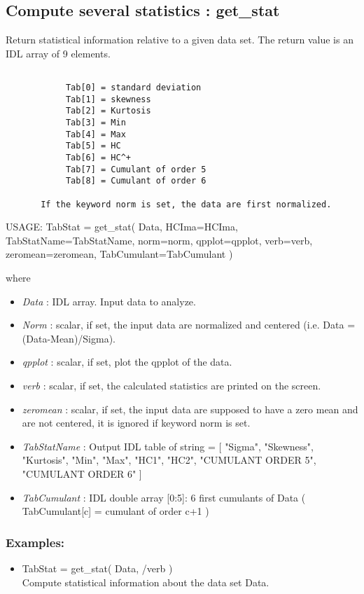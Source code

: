 \subsection{Compute several statistics : get\_stat}
Return statistical information relative to a given data set. The return value is an IDL array of 9 elements.
\begin{verbatim}

			Tab[0] = standard deviation
			Tab[1] = skewness
			Tab[2] = Kurtosis
			Tab[3] = Min
			Tab[4] = Max 
			Tab[5] = HC
			Tab[6] = HC^+
			Tab[7] = Cumulant of order 5
			Tab[8] = Cumulant of order 6

       If the keyword norm is set, the data are first normalized.
\end{verbatim}
{\bf
\begin{center}
     USAGE: TabStat = get\_stat( Data, HCIma=HCIma, TabStatName=TabStatName, norm=norm, qpplot=qpplot, verb=verb, zeromean=zeromean, TabCumulant=TabCumulant )  
\end{center}}
where 
\begin{itemize}
\item {\em Data} : IDL array. Input data to analyze. 
\item {\em Norm} : scalar, if set, the input data are normalized and centered (i.e. Data = (Data-Mean)/Sigma).  
\item {\em qpplot} : scalar, if set, plot the qpplot of the data.
\item {\em verb} : scalar, if set, the calculated statistics are printed on the screen.
\item {\em zeromean} : scalar, if set, the input data are supposed to have a zero mean and are not centered, it is ignored if keyword norm is set.
\item {\em TabStatName} : Output IDL table of string = [ "Sigma", "Skewness", "Kurtosis", "Min", "Max", "HC1", "HC2", "CUMULANT ORDER 5", "CUMULANT ORDER 6" ]
\item {\em TabCumulant} : IDL double array [0:5]: 6 first cumulants of Data  ( TabCumulant[c] = cumulant of order c+1 )
\end{itemize}

\subsubsection*{Examples:} 
\begin{itemize}
\item TabStat = get\_stat( Data, /verb )  \\
Compute statistical information about the data set Data.
\end{itemize}



